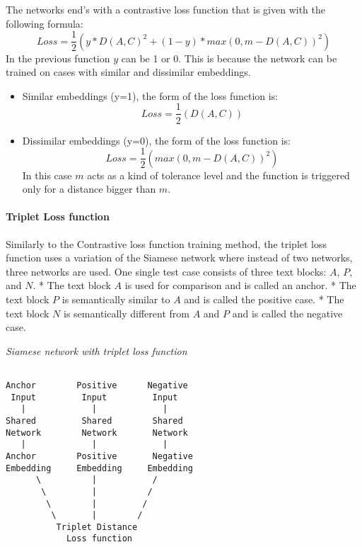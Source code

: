 \documentclass{wseas}
\begin{document}
The networks end's with a contrastive loss function that is given with
the following formula:
\begin{equation} 
  Loss =  \frac{1}{2} (y*D(A,C)^2 + (1-y)*max(0,m-D(A,C))^2)
\end{equation}
In the previous function \(y\) can be 1 or 0. This is because the
network can be trained on cases with similar and dissimilar embeddings.

\begin{itemize}

\item
  Similar embeddings (y=1), the form of the loss function is: 
  \begin{equation}
    Loss = \frac{1}{2}(D(A,C))
  \end{equation}

\item
  Dissimilar embeddings (y=0), the form of the loss function is: 
  \begin{equation}
    Loss =  \frac{1}{2}(max(0,m-D(A,C))^2)
  \end{equation}
  In this case \(m\) acts as a kind of tolerance level and the
  function is triggered only for a distance bigger than \(m\).
\end{itemize}


\paragraph{Triplet Loss function}

Similarly to the Contrastive loss function training method, the triplet
loss function uses a variation of the Siamese network where instead of
two networks, three networks are used. One single test case consists of
three text blocks: \(A\), \(P\), and \(N\). * The text block \(A\) is
used for comparison and is called an anchor. * The text block \(P\) is
semantically similar to \(A\) and is called the positive case. * The
text block \(N\) is semantically different from \(A\) and \(P\) and is
called the negative case.

\emph{Siamese network with triplet loss function}

\begin{verbatim}
                   
Anchor        Positive      Negative
 Input         Input         Input
   |             |             |
Shared         Shared        Shared
Network        Network       Network
   |             |             |
Anchor        Positive       Negative
Embedding     Embedding     Embedding
      \          |           /
       \         |          /  
        \        |         /
         \       |        /
          Triplet Distance
            Loss function     
\end{verbatim}
\end{document}
